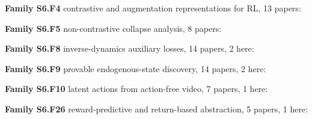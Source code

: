 \documentclass[10pt]{article}
\newcommand{\memb}[1]{\par\smallskip\textbf{#1}\quad}
\begin{document}
\memb{Family S6.F4} contrastive and augmentation representations for RL, 13 papers: {\footnotesize \citetext{\citealp{Hjelm-learning18}; \citealp{Oord-representation18}; \citealp{Anand-unsupervised19}; \citealp{Kipf-contrastive19}; \citealp{Tschannen-mutual19}; \citealp{Yarats-improving19}; \citealp{Kostrikov-image20}; \citealp{Laskin-reinforcement20}; \citealp{Mazoure-deep20}; \citealp{Srinivas-curl20}; \citealp{Stooke-decoupling20}; \citealp{Tomar-learning21}; \citealp{Li-selfsupervised22}}}

\memb{Family S6.F5} non-contrastive collapse analysis, 8 papers: {\footnotesize \citetext{\citealp{Tian-understanding21}; \citealp{Chen-exploring20}; \citealp{Grill-bootstrap20}; \citealp{Richemond-byol20}; \citealp{Wang-demystifying21}; \citealp{Wen-mechanism22}; \citealp{Zhang-simsiam22}; \citealp{Bao-feature23}}}

\memb{Family S6.F8} inverse-dynamics auxiliary losses, 14 papers, 2 here: {\footnotesize \citetext{\citealp{Whitney-dynamicsaware19}; \citealp{Zheng-taco23}}}

\memb{Family S6.F9} provable endogenous-state discovery, 14 papers, 2 here: {\footnotesize \citetext{\citealp{Agarwal-flambe20}; \citealp{Uehara-representation21}}}

\memb{Family S6.F10} latent actions from action-free video, 7 papers, 1 here: {\footnotesize \citetext{\citealp{Seo-reinforcement22}}}

\memb{Family S6.F26} reward-predictive and return-based abstraction, 5 papers, 1 here: {\footnotesize \citetext{\citealp{Lehnert-successor19}}}
\end{document}
